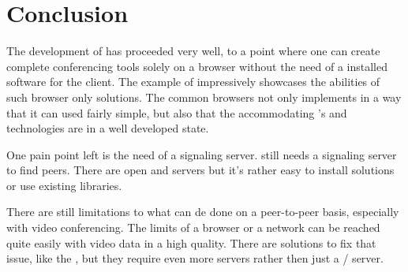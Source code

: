 \clearpage
\chapter{Conclusion}

The development of  has proceeded very well, to a point where one can create complete conferencing tools solely on a browser without the need of a installed software for the client. The example of  impressively showcases the abilities of such browser only solutions. The common browsers not only implements  in a way that it can used fairly simple, but also that the accommodating 's and technologies are in a well developed state.

One pain point left is the need of a signaling server.  still needs a signaling server to find peers. There are open  and  servers but it's rather easy to install  solutions or use existing libraries.

There are still limitations to what can de done on a peer-to-peer basis, especially with video conferencing. The limits of a browser or a network can be reached quite easily with video data in a high quality. There are solutions to fix that issue, like the , but they require even more servers rather then just a / server.